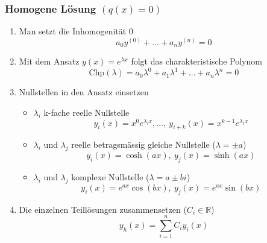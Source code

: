\documentclass[8pt, a4paper, landscape, fleqn]{scrartcl}
\begin{document}
\begin{multicols*}{3}
				\subsubsection{Homogene Lösung $(q(x)=0)$}
					\begin{enumerate}
						\item Man setzt die Inhomogenität 0
						\begin{equation*}
							a_0y^{(0)}+\dots+ a_ny^{(n)}=0
						\end{equation*}
						\item Mit dem Ansatz $y(x)=e^{\lambda x}$ folgt das charakteristische Polynom
						\begin{equation*}
							\text{Chp}(\lambda)=a_0\lambda^0+a_1\lambda^1+\dots +a_n\lambda^n=0
						\end{equation*}
						\item Nullstellen in den Ansatz einsetzen 
							\begin{itemize}
								\item $\lambda_i$  k-fache reelle Nullstelle
								\begin{equation*}
									y_i(x)=x^0e^{\lambda_i x}, \dots,~ y_{i+k}(x)=x^{k-1}e^{\lambda_i x}
								\end{equation*}
								\item $\lambda_i$ und $\lambda_j$ reelle betragsmässig gleiche Nullstelle ($\lambda = \pm a$)
								\begin{equation*}
									y_{i}(x) = \cosh(ax), ~y_j(x)=\sinh(ax)
								\end{equation*}
								\item $\lambda_i$ und $\lambda_j$ komplexe Nullstelle ($\lambda = a \pm bi$)
								\begin{equation*}
									y_{i}(x)=e^{ax}\cos(bx), ~y_j(x)=e^{ax}\sin(bx)
								\end{equation*}
							\end{itemize}
						\item Die einzelnen Teillösungen zusammensetzen ($C_i \in \mathbb{R}$)
						\begin{equation*}
							y_h(x)=\sum_{i=1}^{n}C_i y_i(x)
						\end{equation*}
					\end{enumerate}

\end{multicols*}
\end{document}
